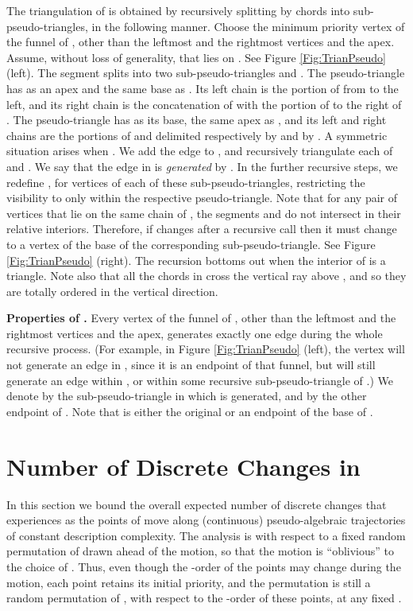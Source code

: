 \documentclass[11pt]{article}
\begin{document}
The triangulation  of  is obtained by recursively
splitting  by chords into sub-pseudo-triangles, in the following
manner.  Choose the minimum priority vertex  of the funnel of
, other than the leftmost and the rightmost vertices and the
apex. Assume, without loss of generality, that  lies on
. See Figure \ref{Fig:TrianPseudo} (left). The segment  splits  into two
sub-pseudo-triangles  and . The pseudo-triangle  has  as an
apex and the same base as . Its left chain is the portion of
 from  to the left, and its right chain is the
concatenation of  with the portion of  to the right
of . The pseudo-triangle  has  as its base, the
same apex as , and its left and right chains are the portions of
 and  delimited respectively by  and by
. A symmetric situation arises when . We add the
edge  to , and recursively triangulate each of
 and . We say that the edge  in  is
\textit{generated} by .  In the further recursive steps, we redefine
, for vertices  of each of these sub-pseudo-triangles,
restricting the visibility to only within the respective
pseudo-triangle. 
Note that for any pair of vertices  that lie on the same chain of , the segments  and  do not intersect in their relative interiors. Therefore, if  changes after a recursive call then it must change to a vertex of the base of the corresponding sub-pseudo-triangle.
See Figure \ref{Fig:TrianPseudo} (right). 
The recursion
bottoms out when the interior of  is a triangle.
Note also that all the chords in  cross the vertical ray above , and so they are totally ordered in the vertical direction.

\medskip
\noindent
{\bf Properties of .}
Every vertex  of the funnel of , other than the leftmost and the rightmost vertices and the apex, generates exactly one edge  during the whole recursive process. (For example, in Figure \ref{Fig:TrianPseudo} (left), the vertex  will not generate an edge in , since it is an endpoint of that funnel, but will still generate an edge within , or within some recursive sub-pseudo-triangle of .) 
We denote by  the sub-pseudo-triangle in which  is generated, and by  the other endpoint of . Note that  is either the original  or an endpoint of the base of .











\section{Number of Discrete Changes in }\label{Sec:CombiChanges}
In this section we bound the overall expected number of discrete changes that  experiences as the points of  move along (continuous) pseudo-algebraic trajectories of constant description complexity.
The analysis is with respect to a fixed random permutation  of  drawn ahead of the motion, so that the motion is ``oblivious'' to the choice of . Thus, even though the -order of the points may change during the motion, each point retains its initial priority, and the permutation  is still a random permutation of , with respect to the -order of these points, at any fixed .
\end{document}
